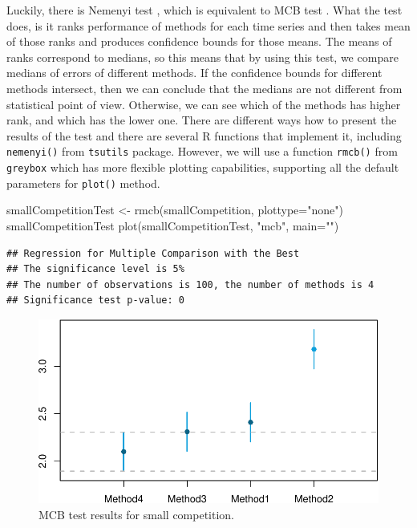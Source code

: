 \documentclass[
]{book}
\newenvironment{Shaded}{\begin{snugshade}}{\end{snugshade}}
\newcommand{\AttributeTok}[1]{\textcolor[rgb]{0.77,0.63,0.00}{#1}}
\newcommand{\FunctionTok}[1]{\textcolor[rgb]{0.00,0.00,0.00}{#1}}
\newcommand{\NormalTok}[1]{#1}
\newcommand{\OtherTok}[1]{\textcolor[rgb]{0.56,0.35,0.01}{#1}}
\newcommand{\StringTok}[1]{\textcolor[rgb]{0.31,0.60,0.02}{#1}}
\theoremstyle{definition}
\theoremstyle{definition}
\theoremstyle{definition}
\theoremstyle{definition}
\theoremstyle{remark}
\begin{document}
Luckily, there is Nemenyi test \citep{Demsar2006}, which is equivalent to MCB test \citep{Koning2005}. What the test does, is it ranks performance of methods for each time series and then takes mean of those ranks and produces confidence bounds for those means. The means of ranks correspond to medians, so this means that by using this test, we compare medians of errors of different methods. If the confidence bounds for different methods intersect, then we can conclude that the medians are not different from statistical point of view. Otherwise, we can see which of the methods has higher rank, and which has the lower one. There are different ways how to present the results of the test and there are several R functions that implement it, including \texttt{nemenyi()} from \texttt{tsutils} package. However, we will use a function \texttt{rmcb()} from \texttt{greybox} which has more flexible plotting capabilities, supporting all the default parameters for \texttt{plot()} method.

\begin{Shaded}
\begin{Highlighting}[]
\NormalTok{smallCompetitionTest }\OtherTok{\textless{}{-}} \FunctionTok{rmcb}\NormalTok{(smallCompetition, }\AttributeTok{plottype=}\StringTok{"none"}\NormalTok{)}
\NormalTok{smallCompetitionTest}
\FunctionTok{plot}\NormalTok{(smallCompetitionTest, }\StringTok{"mcb"}\NormalTok{, }\AttributeTok{main=}\StringTok{""}\NormalTok{)}
\end{Highlighting}
\end{Shaded}

\begin{verbatim}
## Regression for Multiple Comparison with the Best
## The significance level is 5%
## The number of observations is 100, the number of methods is 4
## Significance test p-value: 0
\end{verbatim}

\begin{figure}
\centering
\includegraphics{adam_files/figure-latex/mcbForCompetition-1.pdf}
\caption{\label{fig:mcbForCompetition}MCB test results for small competition.}
\end{figure}
\end{document}
